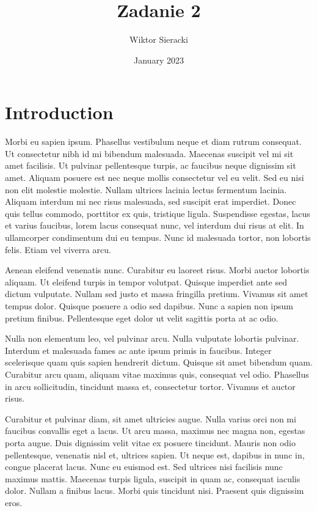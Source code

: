 \documentclass{beamer}
\title{Zadanie 2}
\author{Wiktor Sieracki }
\date{January 2023}
\begin{document}
\maketitle

\section{Introduction}

\newpage
Morbi eu sapien ipsum. Phasellus vestibulum neque et diam rutrum consequat. Ut consectetur nibh id mi bibendum malesuada. Maecenas suscipit vel mi sit amet facilisis. Ut pulvinar pellentesque turpis, ac faucibus neque dignissim sit amet. Aliquam posuere est nec neque mollis consectetur vel eu velit. Sed eu nisi non elit molestie molestie. Nullam ultrices lacinia lectus fermentum lacinia. Aliquam interdum mi nec risus malesuada, sed suscipit erat imperdiet. Donec quis tellus commodo, porttitor ex quis, tristique ligula. Suspendisse egestas, lacus et varius faucibus, lorem lacus consequat nunc, vel interdum dui risus at elit. In ullamcorper condimentum dui eu tempus. Nunc id malesuada tortor, non lobortis felis. Etiam vel viverra arcu.

Aenean eleifend venenatis nunc. Curabitur eu laoreet risus. Morbi auctor lobortis aliquam. Ut eleifend turpis in tempor volutpat. Quisque imperdiet ante sed dictum vulputate. Nullam sed justo et massa fringilla pretium. Vivamus sit amet tempus dolor. Quisque posuere a odio sed dapibus. Nunc a sapien non ipsum pretium finibus. Pellentesque eget dolor ut velit sagittis porta at ac odio.

Nulla non elementum leo, vel pulvinar arcu. Nulla vulputate lobortis pulvinar. Interdum et malesuada fames ac ante ipsum primis in faucibus. Integer scelerisque quam quis sapien hendrerit dictum. Quisque sit amet bibendum quam. Curabitur arcu quam, aliquam vitae maximus quis, consequat vel odio. Phasellus in arcu sollicitudin, tincidunt massa et, consectetur tortor. Vivamus et auctor risus.

Curabitur et pulvinar diam, sit amet ultricies augue. Nulla varius orci non mi faucibus convallis eget a lacus. Ut arcu massa, maximus nec magna non, egestas porta augue. Duis dignissim velit vitae ex posuere tincidunt. Mauris non odio pellentesque, venenatis nisl et, ultrices sapien. Ut neque est, dapibus in nunc in, congue placerat lacus. Nunc eu euismod est. Sed ultrices nisi facilisis nunc maximus mattis. Maecenas turpis ligula, suscipit in quam ac, consequat iaculis dolor. Nullam a finibus lacus. Morbi quis tincidunt nisi. Praesent quis dignissim eros.
\end{document}
